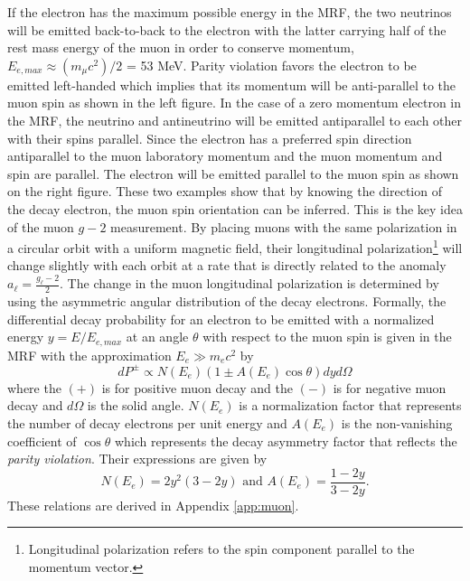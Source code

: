 \documentclass{outhesis}
\begin{document}
If the electron has the maximum possible energy in the MRF, the two neutrinos will be emitted back-to-back to the electron with the latter carrying half of the rest mass energy of the muon in order to conserve momentum, $E_{e,max}\approx \left(m_{\mu}c^2\right)/2$ = 53 MeV. 
Parity violation favors the electron to be emitted left-handed which implies that its momentum will be anti-parallel to the muon spin as shown in the left figure. In the case of a zero momentum electron in the MRF, the neutrino and antineutrino will be emitted antiparallel to each other with their spins parallel. Since the electron has a preferred spin direction antiparallel to the muon laboratory momentum and the muon momentum and spin are parallel. The electron will be emitted parallel to the muon spin as shown on the right figure. These two examples show that by knowing the direction of the decay electron, the muon spin orientation can be inferred. This is the key idea of the muon $g-2$ measurement. By placing muons with the same polarization in a circular orbit with a uniform magnetic field, their longitudinal polarization\footnote{Longitudinal polarization refers to the spin component parallel to the momentum vector.} will change slightly with each orbit at a rate that is directly related to the anomaly $a_{\ell} = \frac{g_\ell-2}{2}$. The change in the muon longitudinal polarization is determined by using the asymmetric angular distribution of the decay electrons. Formally, the differential decay probability for an electron to be emitted with a normalized energy $y=E/E_{e,max}$ at an angle $\theta$ with respect to the muon spin is given in the MRF with the approximation $E_e \gg m_e c^2$ by
\begin{equation}
dP^{\pm} \propto N\left(E_e\right)\left(1 \pm A(E_e)\cos \theta \right) dy d\Omega
\label{eq:prob}
\end{equation}
where the $(+)$ is for positive muon decay and the $(-)$ is for negative muon decay and $d\Omega$ is the solid angle. $N\left(E_e\right)$ is a normalization factor that represents the number of decay electrons per unit energy and $A\left(E_e\right)$ is the non-vanishing coefficient of $\cos \theta$ which represents the decay asymmetry factor that reflects the \emph{parity violation}. Their expressions are given by
\begin{equation}
N\left(E_e\right) = 2y^2\left(3-2y\right)  \,\,  \text{and}  \,\,  A\left(E_e\right) = \frac{1-2y}{3-2y}.
\label{eq:na}
\end{equation}
These relations are derived in Appendix \ref{app:muon}.
\end{document}
